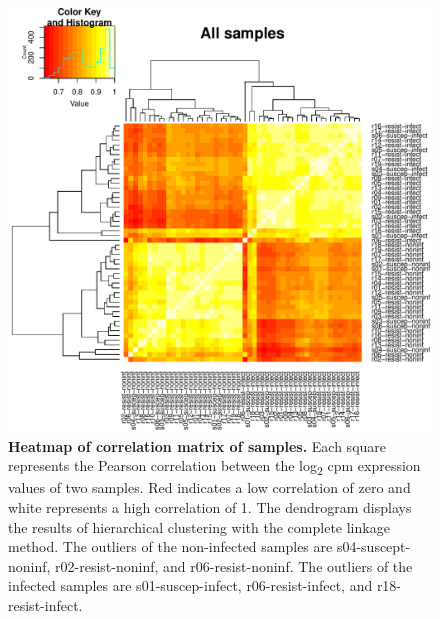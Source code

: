 \begin{figure}[ht]
\centering
\includegraphics[width=5in]{img/ch03/heatmap-all-samples.pdf}
\caption[Heatmap of correlation matrix of samples.]{
\textbf{Heatmap of correlation matrix of samples.} Each square represents the
Pearson correlation between the log\textsubscript{2} cpm expression
values of two samples. Red indicates a low correlation of zero and
white represents a high correlation of 1. The dendrogram displays the
results of hierarchical clustering with the complete linkage method.
The outliers of the non-infected samples are s04-suscept-noninf,
r02-resist-noninf, and r06-resist-noninf. The outliers of the infected
samples are s01-suscep-infect, r06-resist-infect, and
r18-resist-infect.
}
\label{fig:heat-all}
\end{figure}

